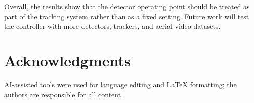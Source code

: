 \documentclass[journal]{new-aiaa}
\begin{document}
Overall, the results show that the detector operating point should be treated
as part of the tracking system rather than as a fixed setting. Future work
will test the controller with more detectors, trackers, and aerial video
datasets.

\section*{Acknowledgments}
AI-assisted tools were used for language editing and LaTeX formatting; the authors are responsible for all content.


\end{document}

